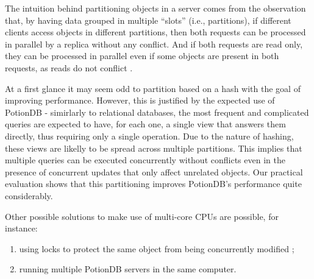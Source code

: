 \documentclass{vldb}
\newcommand{\grumbler}[2]{{\color{red}{\bf #1:} #2}}
\renewcommand{\grumbler}[2]{}
\newcommand{\andre}[1]{\grumbler{andre}{#1}}
\begin{document}
The intuition behind partitioning objects in a server comes from the observation that, by having data grouped in multiple ``slots'' (i.e., partitions), if different clients access objects in different partitions, then both requests can be processed in parallel by a replica without any conflict.
And if both requests are read only, they can be processed in parallel even if some objects are present in both requests, as reads do not conflict \cite{???}.

At a first glance it may seem odd to partition based on a hash with the goal of improving performance.
However, this is justified by the expected use of PotionDB - simirlarly to relational databases, the most frequent and complicated queries are expected to have, for each one, a single view that answers them directly, thus requiring only a single operation.
Due to the nature of hashing, these views are likelly to be spread across multiple partitions.
This implies that multiple queries can be executed concurrently without conflicts even in the presence of concurrent updates that only affect unrelated objects.
Our practical evaluation shows that this partitioning improves PotionDB's performance quite considerably. \andre{Does it actually show that? Should we show that?}

\andre{What's below is probably not needed. It's just a comparison with other alternatives}

Other possible solutions to make use of multi-core CPUs are possible, for instance:
\begin{enumerate}
	\item \label{item:locks} using locks to protect the same object from being concurrently modified \cite{???};
	\item \label{item:multiplePotion} running multiple PotionDB servers in the same computer.
\end{enumerate}

\end{document}
